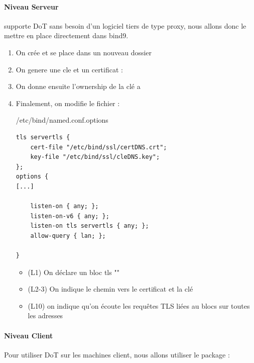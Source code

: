 \documentclass{article}
\begin{document}
\paragraph{Niveau Serveur}
 supporte DoT sans besoin d'un logiciel tiers de type proxy, nous allons donc le mettre en place directement dans bind9.
\begin{enumerate}
	\item On crée et se place dans un nouveau dossier 
	\item On genere une cle et un certificat :
	\item On donne ensuite l'ownership de la clé a 
	\item Finalement, on modifie le fichier  : 
	\begin{configbox}{/etc/bind/named.conf.options}
		\begin{lstlisting}
tls servertls {
	cert-file "/etc/bind/ssl/certDNS.crt";
	key-file "/etc/bind/ssl/cleDNS.key";
};
options {
[...]

	listen-on { any; };
	listen-on-v6 { any; };
	listen-on tls servertls { any; };
	allow-query { lan; };

}
		\end{lstlisting}
	\end{configbox}
	\begin{itemize}
		\item (L1) On déclare un bloc tls ""
		\item (L2-3) On indique le chemin vers le certificat et la clé
		\item (L10) on indique qu'on écoute les requêtes TLS liées au blocs  sur toutes les adresses
	\end{itemize}
\end{enumerate}

\paragraph{Niveau Client\\}

Pour utiliser DoT sur les machines client, nous allons utiliser le package  :
\end{document}
